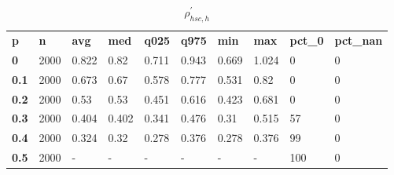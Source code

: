 \begin{table}[h]
 \centering 
\footnotesize
\caption{$\rho_{hsc,h}^\prime $}
\label{tab:alphahsch}
\begin{tabular}[h]{| l l l l l l l l l l|
    } \hline
\textbf{ p} & \textbf{ n} & \textbf{ avg} & \textbf{ med} & \textbf{ q025} & \textbf{ q975} & \textbf{ min} & \textbf{ max} & \textbf{ pct\_0} & \textbf{ pct\_nan}
           \\
  \textbf{  0} & 2000 & 0.822 &  0.82 & 0.711 & 0.943 & 0.669 & 1.024 &   0 & 0
           \\
  \textbf{0.1} & 2000 & 0.673 &  0.67 & 0.578 & 0.777 & 0.531 &  0.82 &   0 & 0
           \\
  \textbf{0.2} & 2000 &  0.53 &  0.53 & 0.451 & 0.616 & 0.423 & 0.681 &   0 & 0
           \\
  \textbf{0.3} & 2000 & 0.404 & 0.402 & 0.341 & 0.476 &  0.31 & 0.515 &  57 & 0
           \\
  \textbf{0.4} & 2000 & 0.324 &  0.32 & 0.278 & 0.376 & 0.278 & 0.376 &  99 & 0
           \\
  \textbf{0.5} & 2000 & - & - & - & - & - & - & 100 & 0
           \\
 \hline \end{tabular}
 \end{table}
